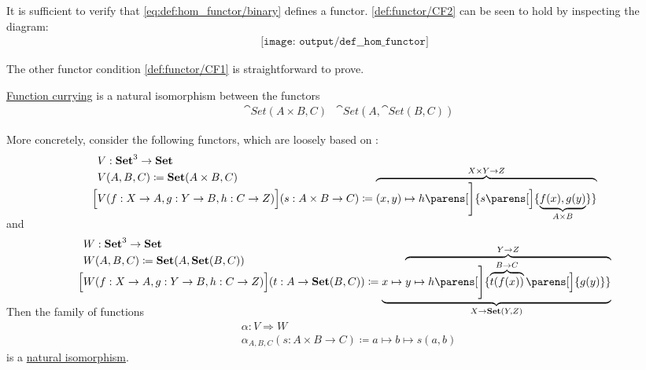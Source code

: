 \begin{defproof}
  It is sufficient to verify that \eqref{eq:def:hom_functor/binary} defines a functor. \ref{def:functor/CF2} can be seen to hold by inspecting the diagram:
  \begin{equation}\label{eq:def:hom_functor/inv_composition}
    \begin{aligned}
      \texttt{[image: output/def\_\_hom\_functor]}
    \end{aligned}
  \end{equation}

  The other functor condition \ref{def:functor/CF1} is straightforward to prove.
\end{defproof}

\begin{proposition}\label{thm:currying_is_natural_isomorphism}
  \hyperref[def:function/currying]{Function currying} is a natural isomorphism between the functors
  \begin{align*}
    &\cat{Set}(A \times B, C)
    &\cat{Set}(A, \cat{Set}(B, C))
  \end{align*}

  More concretely, consider the following functors, which are loosely based on :
  \begin{equation*}
    \begin{aligned}
      &V: \cat{Set}^3 \to \cat{Set} \\
      &V(A, B, C) \coloneqq \cat{Set}(A \times B, C) \\
      \Big[& V(f: X \to A, g: Y \to B, h: C \to Z) \Big](s: A \times B \to C) \coloneqq \smash{ \overbrace{ (x, y) \mapsto h\parens[\Bigg]{ s\parens[\Big]{ \underbrace{ f(x), g(y) }_{A \times B} } } }^{X \times Y \to Z} } \\
    \end{aligned}
  \end{equation*}
  and
  \begin{equation*}
    \begin{aligned}
      &W: \cat{Set}^3 \to \cat{Set} \\
      &W(A, B, C) \coloneqq \cat{Set}(A, \cat{Set}(B, C)) \\
      \Big[& W(f: X \to A, g: Y \to B, h: C \to Z) \Big](t: A \to \cat{Set}(B, C)) \coloneqq \smash{ \underbrace{ x \mapsto \overbrace{y \mapsto h\parens[\Bigg]{ \overbrace{t(f(x))}^{B \to C}\parens[\Big]{ g(y) } } }^{Y \to Z} }_{X \to \cat{Set}(Y, Z)} } \\
    \end{aligned}
  \end{equation*}

  Then the family of functions
  \begin{equation*}
    \begin{aligned}
      &\alpha: V \Rightarrow W \\
      &\alpha_{A,B,C}(s: A \times B \to C) \coloneqq a \mapsto b \mapsto s(a, b)
    \end{aligned}
  \end{equation*}
  is a \hyperref[thm:natural_isomorphism]{natural isomorphism}.
\end{proposition}
